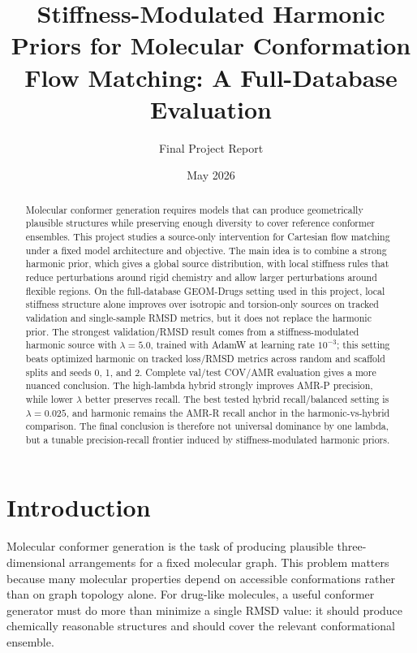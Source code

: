 \documentclass[11pt]{article}
\title{Stiffness-Modulated Harmonic Priors for Molecular Conformation Flow Matching: A Full-Database Evaluation}
\author{Final Project Report}
\date{May 2026}
\begin{document}
\maketitle

\begin{abstract}
Molecular conformer generation requires models that can produce geometrically plausible structures while preserving enough diversity to cover reference conformer ensembles. This project studies a source-only intervention for Cartesian flow matching under a fixed model architecture and objective. The main idea is to combine a strong harmonic prior, which gives a global source distribution, with local stiffness rules that reduce perturbations around rigid chemistry and allow larger perturbations around flexible regions. On the full-database GEOM-Drugs setting used in this project, local stiffness structure alone improves over isotropic and torsion-only sources on tracked validation and single-sample RMSD metrics, but it does not replace the harmonic prior. The strongest validation/RMSD result comes from a stiffness-modulated harmonic source with $\lambda=5.0$, trained with AdamW at learning rate $10^{-3}$; this setting beats optimized harmonic on tracked loss/RMSD metrics across random and scaffold splits and seeds 0, 1, and 2. Complete val/test COV/AMR evaluation gives a more nuanced conclusion. The high-lambda hybrid strongly improves AMR-P precision, while lower $\lambda$ better preserves recall. The best tested hybrid recall/balanced setting is $\lambda=0.025$, and harmonic remains the AMR-R recall anchor in the harmonic-vs-hybrid comparison. The final conclusion is therefore not universal dominance by one lambda, but a tunable precision-recall frontier induced by stiffness-modulated harmonic priors.
\end{abstract}

\section{Introduction}

Molecular conformer generation is the task of producing plausible three-dimensional arrangements for a fixed molecular graph. This problem matters because many molecular properties depend on accessible conformations rather than on graph topology alone. For drug-like molecules, a useful conformer generator must do more than minimize a single RMSD value: it should produce chemically reasonable structures and should cover the relevant conformational ensemble.
\end{document}
